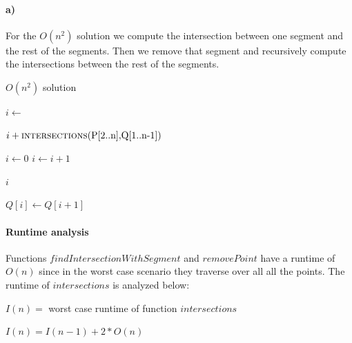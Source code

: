 \paragraph{a)} 
For the $O(n^2)$ solution we compute the intersection between one segment and the rest of the segments. Then we remove that segment and recursively compute the intersections between the rest of the segments.

\begin{algorithm}
	\caption{$O(n^2)$ solution}
	\begin{algorithmic}
	  	\State $i \gets $  
		\State {} 
	
		\Return $i + \Call{intersections}{$P[2..n]$, $Q[1..n-1]$}$
	  \EndFunction
	
		\State $i \gets 0$
			\State $i \gets i + 1$
		\EndWhile
	
		\Return $i$
	  \EndFunction
	
			\State $Q[i] \gets Q[i + 1]$
		\EndFor
	  \EndFunction
	\end{algorithmic}
\end{algorithm}

\paragraph{Runtime analysis}
Functions $findIntersectionWithSegment$ and $removePoint$ have a runtime of $O(n)$ since in the worst case scenario they traverse over all all the points. The runtime of $intersections$ is analyzed below:

\clearpage
$I(n) =$ worst case runtime of function $intersections$

$I(n) = I(n - 1) + 2 * O(n)$

